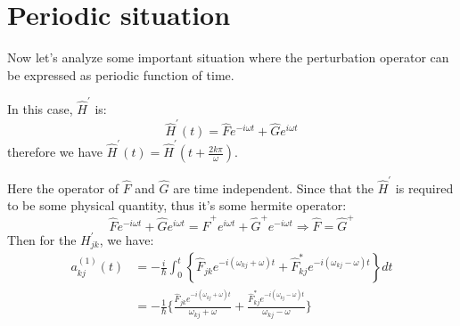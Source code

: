 \section{Periodic situation}
%
%
%
Now let's analyze some important situation where the perturbation
operator can be expressed as periodic function of time\cite{Landau}.

In this case, $\hat{H}^{'}$ is:
\begin{equation}\label{}
\hat{H}^{'}(t) = \hat{F}e^{-i\omega t} + \hat{G}e^{i\omega t}
\end{equation}
therefore we have $\hat{H}^{'}(t) = \hat{H}^{'}(t +
\frac{2k\pi}{\omega})$.

Here the operator of $\hat{F}$ and $\hat{G}$ are time independent.
Since that the $\hat{H}^{'}$ is required to be some physical
quantity, thus it's some hermite operator:
\begin{equation}\label{}
\hat{F}e^{-i\omega t} + \hat{G}e^{i\omega t} = \hat{F}^{+}e^{i\omega
t} + \hat{G}^{+}e^{-i\omega t} \Rightarrow \hat{F} = \hat{G}^{+}
\end{equation}
Then for the $H^{'}_{jk}$, we have:
\begin{align}\label{}
a^{(1)}_{kj}(t) &= -\frac{i}{\hbar}\int_{0}^{t}
\left\{\hat{F}_{jk}e^{-i(\omega_{kj}+\omega) t} +
\hat{F}^{*}_{kj}e^{-i(\omega_{kj}-\omega) t}\right\}dt \nonumber
\\
&=-\frac{1}{\hbar}\bigg\{
\frac{\hat{F}_{jk}e^{-i(\omega_{kj}+\omega)t}} {\omega_{kj}+\omega}
+ \frac{\hat{F}^{*}_{kj}e^{-i(\omega_{kj}-\omega)t}}
{\omega_{kj}-\omega}\bigg\}
\end{align}




